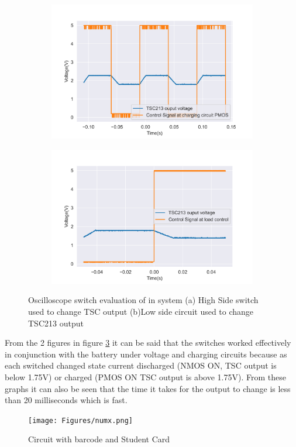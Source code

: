  \begin{figure}[!htb]
 \footnotesize
 \centering
    \begin{subfigure}[]{0.48\textwidth}
              \centering
  		\includegraphics[width=1\linewidth]{./Figures/chargePMOSmeas}
		    \caption{} \label{subfig:risePMOS}
     \end{subfigure}
     \begin{subfigure}[]{0.48\textwidth}
             \centering
  		\includegraphics[width=1\linewidth]{./Figures/NMOSTSCmeas}
		   \caption{ } \label{subfig:riseNMOS}
     \end{subfigure}
   \caption[{Rise Time for different switches }]{Oscilloscope switch evaluation of in system  (a)  High Side switch used to change TSC output  (b)Low side circuit used to change TSC213 output }
    \label{fig:rise}
 \end{figure}
 
 From the 2 figures in figure \ref{fig:rise} it can be said that the switches worked effectively in conjunction with the battery under voltage and charging circuits because as each switched changed state current discharged (NMOS ON, TSC output is below 1.75V) or charged (PMOS ON TSC output is above 1.75V). From these graphs it can also be seen that the time it takes for the output to change is less than 20 milliseconds which is fast.
 
 
 \begin{figure}[!htb]
     \centering
     \texttt{[image: Figures/numx.png]}
     \caption{Circuit with barcode and Student Card}
     \label{fig:required}
 \end{figure}
